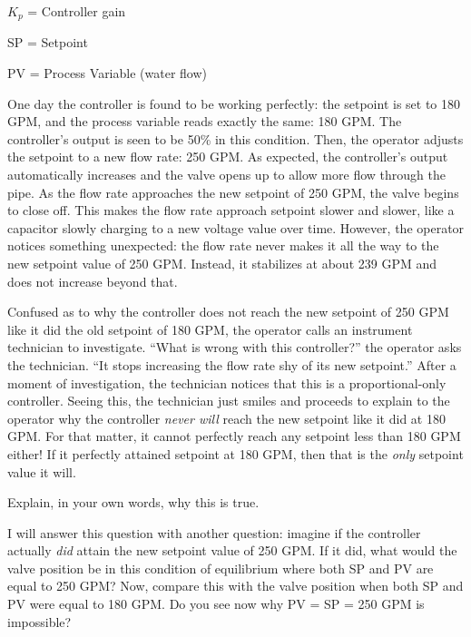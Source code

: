 $K_p$ = Controller gain

SP = Setpoint

PV = Process Variable (water flow)

\vskip 10pt

One day the controller is found to be working perfectly: the setpoint is set to 180 GPM, and the process variable reads exactly the same: 180 GPM.  The controller's output is seen to be 50\% in this condition.  Then, the operator adjusts the setpoint to a new flow rate: 250 GPM.  As expected, the controller's output automatically increases and the valve opens up to allow more flow through the pipe.  As the flow rate approaches the new setpoint of 250 GPM, the valve begins to close off.  This makes the flow rate approach setpoint slower and slower, like a capacitor slowly charging to a new voltage value over time.  However, the operator notices something unexpected: the flow rate never makes it all the way to the new setpoint value of 250 GPM.  Instead, it stabilizes at about 239 GPM and does not increase beyond that.

Confused as to why the controller does not reach the new setpoint of 250 GPM like it did the old setpoint of 180 GPM, the operator calls an instrument technician to investigate.  ``What is wrong with this controller?'' the operator asks the technician.  ``It stops increasing the flow rate shy of its new setpoint.''  After a moment of investigation, the technician notices that this is a proportional-only controller.  Seeing this, the technician just smiles and proceeds to explain to the operator why the controller {\it never will} reach the new setpoint like it did at 180 GPM.  For that matter, it cannot perfectly reach any setpoint less than 180 GPM either!  If it perfectly attained setpoint at 180 GPM, then that is the {\it only} setpoint value it will.

Explain, in your own words, why this is true.







I will answer this question with another question: imagine if the controller actually {\it did} attain the new setpoint value of 250 GPM.  If it did, what would the valve position be in this condition of equilibrium where both SP and PV are equal to 250 GPM?  Now, compare this with the valve position when both SP and PV were equal to 180 GPM.  Do you see now why PV = SP = 250 GPM is impossible?

